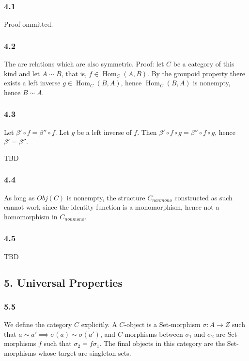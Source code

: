 \documentclass{article}
\DeclareMathOperator{\Hom}{Hom}
\begin{document}
\subsubsection*{4.1}

Proof ommitted.

\subsubsection*{4.2}

The are relations which are also symmetric. Proof: let $C$ be a category of this kind and let $A \sim B$, that is, $f \in \Hom_C(A, B)$. By the groupoid property there exists a left inverse $g \in \Hom_C(B, A)$, hence $\Hom_C(B, A)$ is nonempty, hence $B \sim A$.

\subsubsection*{4.3}

Let $\beta' \circ f  = \beta'' \circ f$. Let $g$ be a left inverse of $f$. Then $\beta' \circ f \circ g = \beta'' \circ f \circ g$, hence $\beta' = \beta''$.

TBD

\subsubsection*{4.4}

As long as $Obj(C)$ is nonempty, the structure $C_{nonmono}$ constructed as such cannot work since the identity function is a monomorphism, hence not a homomorphism in $C_{nonmono}$.

\subsubsection*{4.5}

TBD

\subsection*{5. Universal Properties}

\subsubsection*{5.5}

We define the category $C$ explicitly. A $C$-object is a Set-morphism $\sigma: A \to Z$ such that $a \sim a' \implies \sigma(a) \sim \sigma(a')$, and $C$-morphisms between $\sigma_1$ and $\sigma_2$ are Set-morphisms $f$ such that $\sigma_2 = f \sigma_1$. The final objects in this category are the Set-morphisms whose target are singleton sets.
\end{document}
